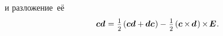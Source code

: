 \begin{otherlanguage}{russian}
\vspace{-0.05em}\noindent и разложение~её
\nopagebreak\vspace{-0.4em}\begin{equation}\label{symmetricantisymmetricdecompositionofdyad}
\hspace*{1em} \bm{c}\bm{d} \hspace{.1ex} = \hspace{.1ex}
\smalldisplaystyleonehalf \hspace{-0.1ex} \left( \bm{c}\bm{d} + \hspace{-0.1ex} \bm{d}\bm{c} \hspace{0.1ex} \right)
- \hspace{.16ex} \smalldisplaystyleonehalf \hspace{-0.1ex} \left( \bm{c} \hspace{-0.1ex} \times \hspace{-0.2ex} \bm{d} \hspace{.2ex} \right) \hspace{-0.12ex} \times \hspace{-0.25ex} \bm{E} \hspace{0.1ex} .
\end{equation}

\end{otherlanguage}



\label{para:eigenvectorseigenvalues}

